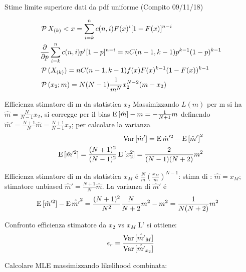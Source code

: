\begin{wordonframe}{Stime limite superiore dati da pdf uniforme (Compito 09/11/18)}
\begin{block}{}
\begin{align*}
&\operatorname{\mathcal{P}}{X_{(k)}<x}=\sum_{i=k}^nc(n,i)F(x)^i[1-F(x)]^{n-i}\\
&\frac{\partial}{\partial p}\sum_{i=k}^nc(n,i)p^{i}[1-p]^{n-i}=nC(n-1,k-1)p^{k-1}(1-p)^{k-1}\\
&\operatorname{\mathcal{P}}{(X_{(k)})}=nC(n-1,k-1)f(x)F(x)^{k-1}(1-F(x))^{k-1}\\
&\operatorname{\mathcal{P}}{(x_2;m)}=N(N-1)\frac{1}{m^N}x_2^{N-2}(m-x_2)
\end{align*}
\end{block}
\begin{block}{Efficienza stimatore di m da statistica $x_2$}
Massimizzando $L(m)$ per m si ha $\hat{m}=\frac{N}{N-1}x_2$, si corregge per il bias $\operatorname{E}{[\hat{m}]}-m=-\frac{1}{N+1}m$ definendo $\hat{m}'=\frac{N+1}{N}\hat{m}=\frac{N+1}{N-1}x_2$; per calcolare la varianza
\begin{align*}
\operatorname{Var}{[\hat{m}']}=\operatorname{E}{\hat{m}'^2}-\operatorname{E}{[\hat{m}']}^2\\
\operatorname{E}{[\hat{m}'^2]}=\frac{(N+1)^2}{(N-1)^2}\operatorname{E}{[x_2^2]}=\frac{2}{(N-1)(N+2)}m^2
\end{align*}
\end{block}
\begin{block}{Efficienza stimatore di m da statistica $x_M$}
 \'e $\frac{N}{m}(\frac{x_M}{m})^{N-1}$: stima di : $\hat{m}=x_M$; stimatore unbiased $\hat{m}'=\frac{N+1}{N}\hat{m}$.
La varianza di $\hat{m}'$ \'e
\begin{align*}
&\operatorname{E}{[\hat{m}'^2]}-\operatorname{E}{\hat{m'}}^2=\frac{(N+1)^2}{N^2}\frac{N}{N+2}m^2-m^2=\frac{1}{N(N+2)}m^2
\end{align*}
\end{block}
\begin{block}{Confronto efficienza stimatore da $x_2$ vs $x_M$}
L' si ottiene:
\begin{equation*}
\epsilon_r=\frac{\operatorname{Var}{[\hat{m'}_{M}]}}{\operatorname{Var}{[\hat{m'}_{x_2}]}}
\end{equation*}
\end{block}
\begin{block}{}
Calcolare MLE massimizzando likelihood combinata:
\begin{align*}

\end{align*}
\end{block}
\end{wordonframe}
